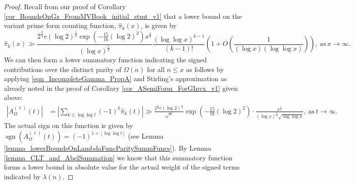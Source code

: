 \documentclass[11pt,reqno,a4letter]{article}
\numberwithin{figure}{section}
\numberwithin{table}{section}
\newcommand{\floor}[1]{\left\lfloor #1 \right\rfloor}
\theoremstyle{plain}
\numberwithin{theorem}{section}
\theoremstyle{definition}
\newcommand{\SuccSim}[0]{\overset{_{\scriptsize{\blacktriangle}}}{\succsim}}
\renewcommand{\SuccSim}[0]{\ensuremath{\gg}}
\begin{document}
\begin{proof} 
Recall from our proof of Corollary \ref{cor_BoundsOnGz_FromMVBook_initial_stmt_v1} that 
a lower bound on the variant prime form counting function, $\widehat{\pi}_k(x)$, is given by 
\[
\widehat{\pi}_k(x) \SuccSim \frac{2^{\frac{3}{4}} e (\log 2)^{\frac{1}{2}} 
     \exp\left(-\frac{15}{16} (\log 2)^2\right) 
     x^{\frac{1}{4}}}{(\log x)^{\frac{5}{2}}} 
     \frac{(\log\log x)^{k-1}}{(k-1)!} \left(1 + 
     O\left(\frac{1}{(\log x) (\log\log x)}\right)\right), 
     \mathrm{\ as\ } x \rightarrow \infty. 
\]
We can then form a lower summatory function indicating the signed contributions over the distinct 
parity of $\Omega(n)$ for all $n \leq x$ as follows by applying 
\eqref{eqn_IncompleteGamma_PropA} and Stirling's approximation as already noted in the 
proof of Corollary \ref{cor_ASemiForm_ForGInvx_v1} given above: 
\begin{align} 
\label{proof_thm_GInvFunc_v0} 
\left\lvert A_{\Omega}^{(\ell)}(t) \right\rvert & = 
     \left\lvert \sum_{k \leq \log\log t} (-1)^k \widehat{\pi}_k(t) \right\rvert 
     \gg \frac{2^{\frac{1}{4}} e (\log 2)^{\frac{1}{2}}}{\sqrt{\pi}} 
     \exp\left(-\frac{15}{16} (\log 2)^2\right) \cdot 
     \frac{x^{\frac{1}{4}}}{(\log x)^{\frac{3}{2}} \sqrt{\log\log x}}, 
     \mathrm{\ as\ } t \rightarrow \infty. 
\end{align} 
The actual sign on this function is given by 
$\operatorname{sgn}(A_{\Omega}^{(\ell)}(t)) = (-1)^{1+\floor{\log\log t}}$ 
(see Lemma \ref{lemma_lowerBoundsOnLambdaFuncParitySummFuncs}). 
By Lemma \ref{lemma_CLT_and_AbelSummation}
we know that this summatory function forms a lower bound in absolute value for the 
actual weight of the signed terms indicated by $\lambda(n)$. 


\end{proof}
\end{document}
